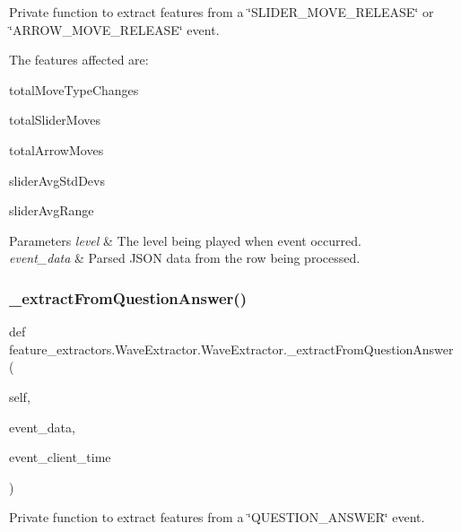 Private function to extract features from a \char`\"{}\+S\+L\+I\+D\+E\+R\+\_\+\+M\+O\+V\+E\+\_\+\+R\+E\+L\+E\+A\+S\+E\char`\"{} or \char`\"{}\+A\+R\+R\+O\+W\+\_\+\+M\+O\+V\+E\+\_\+\+R\+E\+L\+E\+A\+S\+E\char`\"{} event. 

The features affected are\+:
\begin{DoxyItemize}
\item total\+Move\+Type\+Changes
\item total\+Slider\+Moves
\item total\+Arrow\+Moves
\item slider\+Avg\+Std\+Devs
\item slider\+Avg\+Range
\end{DoxyItemize}


\begin{DoxyParams}{Parameters}
{\em level} & The level being played when event occurred. \\
\hline
{\em event\+\_\+data} & Parsed J\+S\+ON data from the row being processed. \\
\hline
\end{DoxyParams}
\mbox{\label{classfeature__extractors_1_1_wave_extractor_1_1_wave_extractor_ae9b6fbab1f81dfda11d3aca51cefdd2c}} 
\subsubsection{\texorpdfstring{\_extractFromQuestionAnswer()}{\_extractFromQuestionAnswer()}}
{\footnotesize\ttfamily def feature\+\_\+extractors.\+Wave\+Extractor.\+Wave\+Extractor.\+\_\+extract\+From\+Question\+Answer (\begin{DoxyParamCaption}\item[{}]{self,  }\item[{}]{event\+\_\+data,  }\item[{}]{event\+\_\+client\+\_\+time }\end{DoxyParamCaption})\hspace{0.3cm}{\ttfamily [private]}}



Private function to extract features from a \char`\"{}\+Q\+U\+E\+S\+T\+I\+O\+N\+\_\+\+A\+N\+S\+W\+E\+R\char`\"{} event. 

